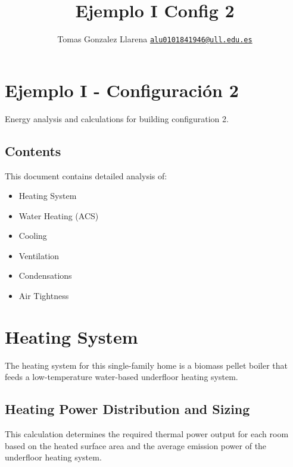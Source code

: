 \documentclass[
  10pt,
  letterpaper,
]{scrbook}
\title{Ejemplo I Config 2}
\author{Tomas Gonzalez Llarena
\href{mailto:alu0101841946@ull.edu.es}{\nolinkurl{alu0101841946@ull.edu.es}}}
\date{}
\providecommand{\tightlist}{%
  \setlength{\itemsep}{0pt}\setlength{\parskip}{0pt}}
\renewcommand*\contentsname{Table of contents}
\newcommand\contentsname{Table of contents}
\begin{document}
\frontmatter
\maketitle

\renewcommand*\contentsname{Table of contents}
{
\setcounter{tocdepth}{2}
\tableofcontents
}

\mainmatter
{}

\chapter{Ejemplo I - Configuración
2}\label{ejemplo-i---configuraciuxf3n-2}

Energy analysis and calculations for building configuration 2.

\section{Contents}\label{contents}

This document contains detailed analysis of:

\begin{itemize}
\tightlist
\item
  Heating System
\item
  Water Heating (ACS)
\item
  Cooling
\item
  Ventilation
\item
  Condensations
\item
  Air Tightness
\end{itemize}


\chapter{Heating System}\label{heating-system}

The heating system for this single-family home is a biomass pellet
boiler that feeds a low-temperature water-based underfloor heating
system.

\section{Heating Power Distribution and
Sizing}\label{heating-power-distribution-and-sizing}

This calculation determines the required thermal power output for each
room based on the heated surface area and the average emission power of
the underfloor heating system.
\end{document}
